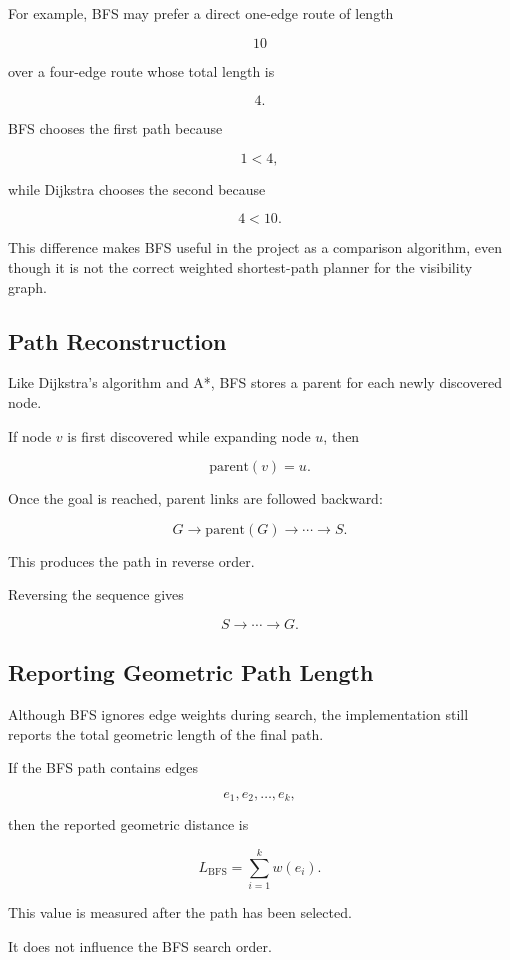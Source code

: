 For example, BFS may prefer a direct one-edge route of length

\[
10
\]

over a four-edge route whose total length is

\[
4.
\]

BFS chooses the first path because

\[
1 < 4,
\]

while Dijkstra chooses the second because

\[
4 < 10.
\]

This difference makes BFS useful in the project as a comparison algorithm,
even though it is not the correct weighted shortest-path planner for the
visibility graph.

\subsection{Path Reconstruction}

Like Dijkstra's algorithm and A*, BFS stores a parent for each newly
discovered node.

If node $v$ is first discovered while expanding node $u$, then

\[
\text{parent}(v)=u.
\]

Once the goal is reached, parent links are followed backward:

\[
G
\rightarrow
\text{parent}(G)
\rightarrow
\cdots
\rightarrow
S.
\]

This produces the path in reverse order.

Reversing the sequence gives

\[
S
\rightarrow
\cdots
\rightarrow
G.
\]

\subsection{Reporting Geometric Path Length}

Although BFS ignores edge weights during search, the implementation still
reports the total geometric length of the final path.

If the BFS path contains edges

\[
e_1,e_2,\ldots,e_k,
\]

then the reported geometric distance is

\[
L_{\text{BFS}}
=
\sum_{i=1}^{k} w(e_i).
\]

This value is measured after the path has been selected.

It does not influence the BFS search order.

